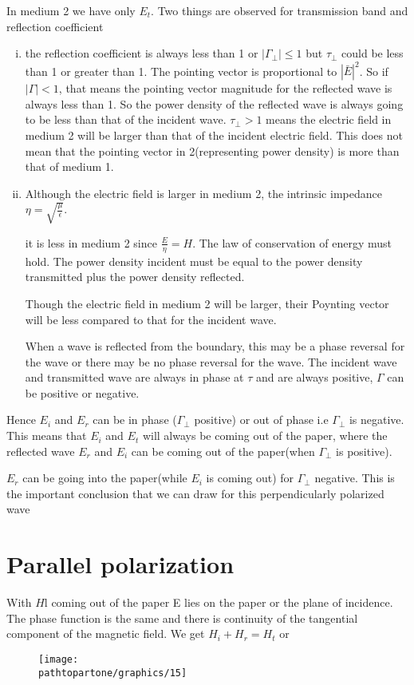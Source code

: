 In medium 2 we have only $E_{t}$. Two things are observed for transmission band and reflection  coefficient
\begin{enumerate}[(i)]
\item the reflection coefficient is always  less than 1 or $|\Gamma_{\bot}| \leq 1$ but $\tau_{\bot}$ could be less than 1 or greater than 1. The pointing vector is proportional  to $|\bar{E}|^{2}$. So if $|\Gamma|< 1$, that means the pointing vector magnitude for the reflected wave is always less than  1. So the power density of the reflected wave is always going to be less than that of the incident wave.  $\tau_{\bot} > 1$ means the electric field in medium 2 will be larger than that of the incident electric field. This does not mean that the pointing vector in 2(representing power density) is more than that of medium 1.

\item Although the electric field is larger in medium 2, the intrinsic impedance $\eta=\sqrt{\frac{\mu}{\epsilon}}$.

it is less in medium 2 since $\frac{E}{\eta} =H$. The law of conservation of energy must hold. The power density incident must be equal to the power density transmitted plus the power density reflected.

Though the electric field in medium 2 will be larger, their Poynting vector will be less compared to that for the incident wave.

When a wave is reflected from the boundary, this may be a phase reversal for the wave or there may be no phase reversal for the wave. The incident wave and transmitted wave are always in phase at $\tau$ and are always positive, $\Gamma$ can be positive or negative.
\end{enumerate}
Hence $E_{i}$ and $E_{r}$ can be in phase ($\Gamma_{\perp}$ positive) or out of phase i.e $\Gamma_{\perp}$ is negative. This means that $E_{i}$ and $E_{t}$ will always be coming out of the paper, where the reflected wave $E_{r}$ and $E_{i}$ can be coming out of the paper(when $\Gamma_{\perp}$ is positive).

$E_{r}$ can be going into the paper(while $E_{i}$ is coming out) for $\Gamma_{\perp}$ negative. This is the important conclusion that we can draw for this perpendicularly polarized wave

\section{Parallel polarization}
With $H$l coming out of the paper E lies on the paper or the plane of incidence. The phase function is the same and there is continuity of the tangential component of the magnetic field.
We get $H_{i} + H_{r} = H_{t}$ or
\begin{figure}[h]
\centering
\texttt{[image: \\pathtopartone/graphics/15]}
\caption{}
\label{fig:15}
\end{figure}

